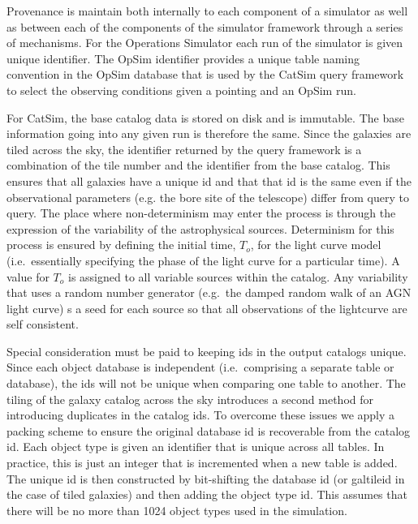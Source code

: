 \documentclass[11pt]{article}
\begin{document}
Provenance is maintain both internally to each component of a
simulator as well as between each of the components
of the simulator framework through a series of mechanisms. For the
Operations Simulator each run of the simulator is given unique
identifier.  The OpSim identifier provides a unique table naming
convention in the OpSim database that is used by the CatSim query
framework to select the observing conditions given a pointing and an
OpSim run. 

For CatSim, the base catalog data is stored on disk and is
immutable. The base information going into any given run is therefore
the same.  Since the galaxies are tiled across the sky, the identifier
returned by the query framework is a combination of the tile number
and the identifier from the base catalog. This ensures that all
galaxies have a unique id and that that id is the same even if the
observational parameters (e.g. the bore site of the telescope) differ
from query to query.  The place where non-determinism may enter the
process is through the expression of the variability of the
astrophysical sources. Determinism for this process is ensured by
defining the initial time, $T_o$, for the light curve model (i.e.\
essentially specifying the phase of the light curve for a particular
time). A value for $T_o$ is assigned to all variable sources within
the catalog.  Any variability that uses a random number
generator (e.g.\ the damped random walk of an AGN light curve) s a
seed for each source so that all observations of the lightcurve are self consistent.

Special consideration must be paid to keeping ids in the output
catalogs unique.  Since each object database is independent (i.e.\
comprising a separate table or database), the ids will not be unique
when comparing one table to another. The tiling of the galaxy catalog
across the sky introduces a second method for introducing duplicates
in the catalog ids. To overcome these issues we apply a packing scheme
to ensure the original database id is recoverable from the catalog id.
Each object type is given an identifier that is unique across all
tables.  In practice, this is just an integer that is incremented when
a new table is added.  The unique id is then constructed by
bit-shifting the database id (or galtileid in the case of tiled
galaxies) and then adding the object type id.  This assumes that there will
be no more than 1024 object types used in the simulation.
\end{document}
